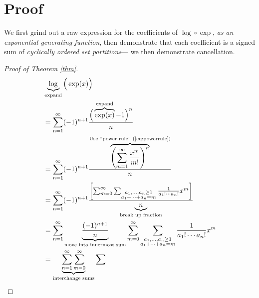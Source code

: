\documentclass{article}
\begin{document}
\section{Proof}

We first grind out a raw expression for the coefficients of $\log \circ \exp$, \textit{as an exponential generating function}, then demonstrate that each coefficient is a signed sum of \textit{cyclically ordered set partitions}--- we then demonstrate cancellation.

\begin{proof}
    [Proof of Theorem \ref{thm}]
    \begin{align*}
        &
        \underbrace{
            \log
        }_{\text{expand}}
        \Big(\exp(x)\Big)
        \\
        &=
        \sum_{n=1}^\infty
        (-1)^{n+1}
        \frac{
            \Big(
                \overbrace{
                    \exp(x)
                }^{\text{expand}}
                -1
            \Big)^n
        }{n}
        \\
        &=
        \sum_{n=1}^\infty
        (-1)^{n+1}
        \frac{
            \overbrace{
                \left(
                    \sum_{m=1}^\infty
                    \frac{x^m}{m!}
                \right)^n
            }^{\text{Use ``power rule'' (\ref{eq:powerrule})}}
        }{n}
        \\
        &=
        \sum_{n=1}^\infty
        (-1)^{n+1}
        \frac{
            \left[
                \sum_{m=0}^\infty
                \sum_{
                    \substack{
                        a_1,\ldots,a_n \geq 1 \\
                        a_1 + \cdots + a_n = m
                    }
                }
                \frac{1}{a_1! \cdots a_n!}
                x^m
            \right]
        }{
            \underbrace{n}_{\text{break up fraction}}
        }
        \\
        &=
        \sum_{n=1}^\infty
        \underbrace{
            \frac{(-1)^{n+1}}{n}
        }_{\text{move into innermost sum}}
        \sum_{m=0}^\infty
        \sum_{
            \substack{
                a_1,\ldots,a_n \geq 1 \\
                a_1 + \cdots + a_n = m
            }
        }
        \frac{1}{a_1! \cdots a_n!}
        x^m
        \\
        &=
        \underbrace{
            \sum_{n=1}^\infty
            \sum_{m=0}^\infty
        }_{\text{interchange sums}}
        \sum_{
            \substack{
}}
\end{align*}
\end{proof}
\end{document}
